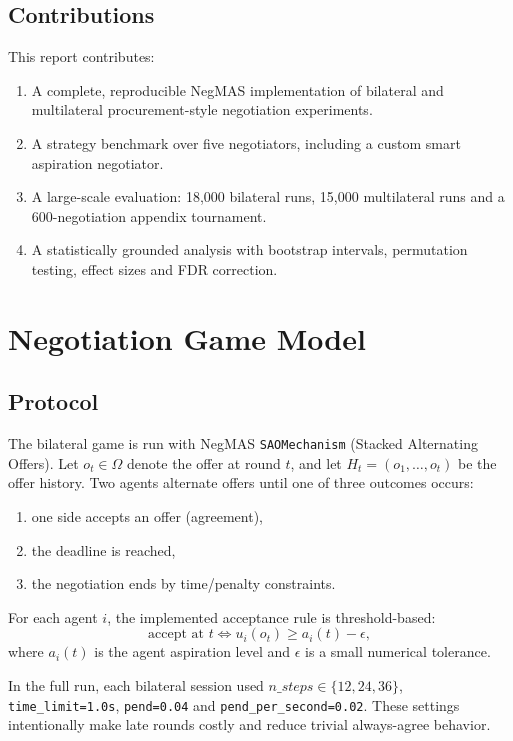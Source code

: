 \documentclass[11pt]{article}
\begin{document}
\subsection{Contributions}
This report contributes:
\begin{enumerate}[leftmargin=1.5em]
    \item A complete, reproducible NegMAS implementation of bilateral and multilateral procurement-style negotiation experiments.
    \item A strategy benchmark over five negotiators, including a custom smart aspiration negotiator.
    \item A large-scale evaluation: 18,000 bilateral runs, 15,000 multilateral runs and a 600-negotiation appendix tournament.
    \item A statistically grounded analysis with bootstrap intervals, permutation testing, effect sizes and FDR correction.
\end{enumerate}

\section{Negotiation Game Model}
\subsection{Protocol}
The bilateral game is run with NegMAS \texttt{SAOMechanism} (Stacked Alternating Offers). Let \(o_t \in \Omega\) denote the offer at round \(t\), and let \(H_t = (o_1,\dots,o_t)\) be the offer history. Two agents alternate offers until one of three outcomes occurs:
\begin{enumerate}[leftmargin=1.5em]
    \item one side accepts an offer (agreement),
    \item the deadline is reached,
    \item the negotiation ends by time/penalty constraints.
\end{enumerate}
For each agent \(i\), the implemented acceptance rule is threshold-based:
\[
\text{accept at } t \iff u_i(o_t) \ge a_i(t) - \epsilon,
\]
where \(a_i(t)\) is the agent aspiration level and \(\epsilon\) is a small numerical tolerance.

In the full run, each bilateral session used \(n\_steps \in \{12,24,36\}\), \texttt{time\_limit=1.0s}, \texttt{pend=0.04} and \texttt{pend\_per\_second=0.02}. These settings intentionally make late rounds costly and reduce trivial always-agree behavior.
\end{document}
